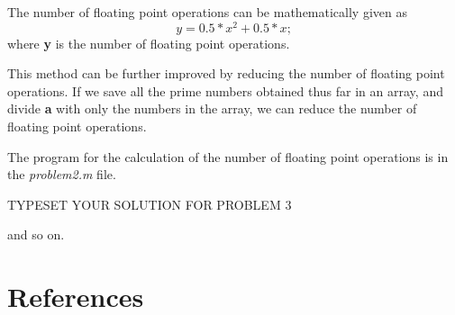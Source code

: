 \documentclass[fleqn,letterpaper,12pt]{report}
\begin{document}
The number of floating point operations can be mathematically given as $$y = 0.5*x^2 + 0.5*x ;$$
where {\bf y} is the number of floating point operations.

This method can be further improved by reducing the number of floating point operations. If we save all the prime numbers obtained thus far in an array, and divide {\bf a} with only the numbers in the array, we can reduce the number of floating point operations.

The program for the calculation of the number of floating point operations is in the {\em problem2.m} file.
%
\newpage
{}
{}
\problem
TYPESET YOUR SOLUTION FOR PROBLEM 3

\vfill
and so on.

\newpage
{}
\section*{References}


\end{document}
